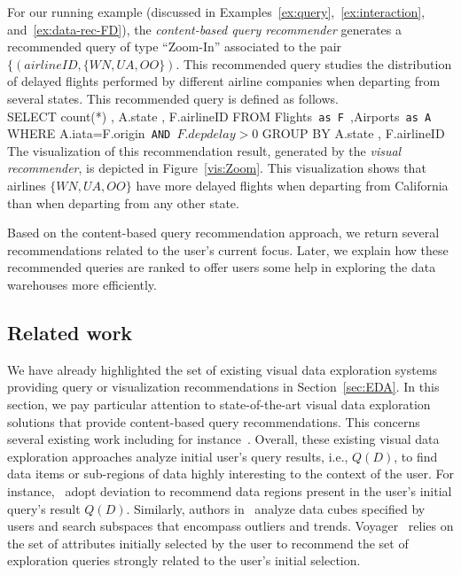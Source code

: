 \begin{example}
\label{ex:query-ZoomIn}
For our running example (discussed in Examples~\ref{ex:query},~\ref{ex:interaction}, and~\ref{ex:data-rec-FD}), the \emph{content-based query recommender} generates a recommended query of type ``Zoom-In'' associated to the pair $\{(airlineID, \{WN,UA,OO\})$.
This recommended query studies the distribution of delayed flights performed by different airline companies when departing from several states.
This recommended query is defined as follows.\\
 \textsf{SELECT }count(*)\textsf{ , }A.state\textsf{ , }{\color{blue}F.airlineID}\textsf{ FROM }Flights\texttt{ as F },Airports\texttt{ as A } \textsf{ WHERE  }A.iata=F.origin\texttt{ AND }$F.depdelay>0$\textsf{ GROUP BY }A.state\textsf{ , }{\color{blue}F.airlineID}\\
 The visualization of this recommendation result, generated by the \emph{visual recommender}, is depicted in Figure~\ref{vis:Zoom}. This visualization shows that airlines $\{WN,UA,OO\}$ have more delayed flights when departing from California than when departing from any other state.
 \end{example}
 


Based on the content-based query recommendation approach, we return several recommendations related to the user's current focus. Later, we explain how these recommended queries are ranked to offer users some help in exploring the data warehouses more efficiently.


 \subsection{Related work}
 \label{sec:content-based-related}
We have already highlighted the set of existing visual data exploration systems providing query or visualization recommendations in Section~\ref{sec:EDA}.
In this section, we pay particular attention to state-of-the-art visual data exploration solutions that provide content-based query recommendations.
This concerns several existing work including for instance~\cite{Vartak,Sellam:16,Tang:2017,Wongsuphasawat2016,Wongsuphasawat:2017,MafrurSK18,Ehsan:18}.
Overall, these existing visual data exploration approaches analyze initial user's query results, i.e., $Q(D)$, to find data items or sub-regions of data highly interesting to the context of the user. For instance,~\cite{Vartak,Sellam:16,MafrurSK18,Ehsan:18} adopt deviation to recommend data regions present in the user's initial query's result $Q(D)$. 
Similarly, authors in~\cite{Tang:2017} analyze data cubes specified by users and search subspaces that encompass outliers and trends. Voyager~\cite{Wongsuphasawat2016,Wongsuphasawat:2017} relies on the set of attributes initially selected by the user to recommend the set of exploration queries strongly related to the user's initial selection. 


